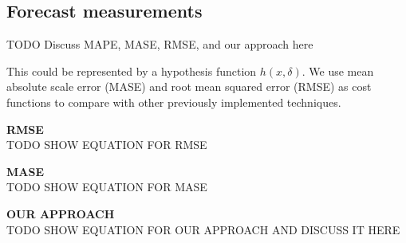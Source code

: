\subsection{Forecast measurements}
TODO Discuss MAPE, MASE, RMSE, and our approach here

This could be represented by a hypothesis function $h(x, \delta)$.  We use mean absolute scale error (MASE) \cite{Hyndman2006} and root mean squared error (RMSE) as cost functions to compare with other previously implemented techniques.

\noindent \textbf{RMSE} \\
TODO SHOW EQUATION FOR RMSE

\noindent \textbf{MASE} \\
TODO SHOW EQUATION FOR MASE

\noindent \textbf{OUR APPROACH} \\
TODO SHOW EQUATION FOR OUR APPROACH AND DISCUSS IT HERE

